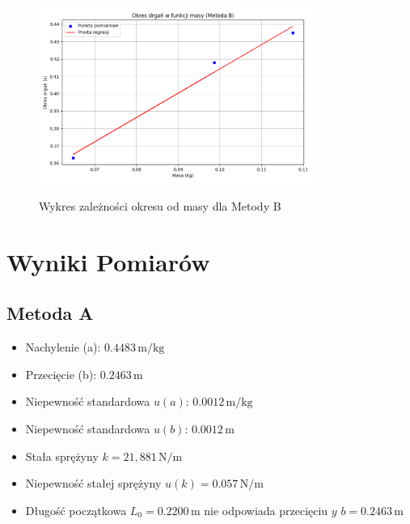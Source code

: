 \documentclass[12pt]{article}
\begin{document}
\begin{figure}[H]
    \centering
    \includegraphics[width=0.8\textwidth]{MetodaB.png}
    \label{fig:wykres2}
    \caption{Wykres zależności okresu od masy dla Metody B}
\end{figure}
\FloatBarrier

\section*{Wyniki Pomiarów}
\subsection*{Metoda A}

\begin{itemize}
    \item Nachylenie (a): \( 0.4483 \, \text{m/kg} \)
    \item Przecięcie (b): \( 0.2463 \, \text{m} \)
    \item Niepewność standardowa \( u(a) \): \( 0.0012 \, \text{m/kg} \)
    \item Niepewność standardowa \( u(b) \): \( 0.0012 \, \text{m} \)
    \item Stała sprężyny \( k = 21,881 \, \text{N/m} \)
    \item Niepewność stałej sprężyny \( u(k) = 0.057 \, \text{N/m} \)
    \item Długość początkowa \( L_0 = 0.2200 \, \text{m} \) nie odpowiada przecięciu \( y \) \( b = 0.2463 \, \text{m} \)
\end{itemize}
\end{document}
